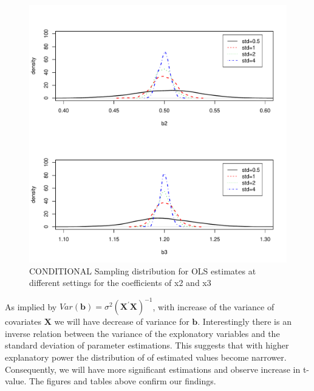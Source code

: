 \documentclass[11pt,reqno]{article}   %
\newcommand{\mlt}[1]{\mathbf{#1}} %
\newcommand{\kt}{^{\prime}}
\newcommand{\kX}{\mlt{X}}
\newcommand{\kb}{\mlt{b}}
\begin{document}
\begin{figure}[!ht]
\centering
\includegraphics{ps2-R7}
\caption{CONDITIONAL Sampling distribution for OLS estimates at different settings for the coefficients of x2 and x3}
\label{fig:combos}
\end{figure}

As implied by $Var(\kb) = \sigma^2(\kX\kt\kX)^{-1}$, with increase of the variance of covariates $\kX$ we will have decrease of variance for $\kb$. Interestingly there is an inverse relation between the variance of the explonatory variables and the standard deviation of parameter estimations. This suggests that with higher explanatory power the distribution of of estimated values become narrower. Consequently, we will have more significant estimations and observe increase in t-value. The figures and tables above confirm our findings. 
\end{document}
